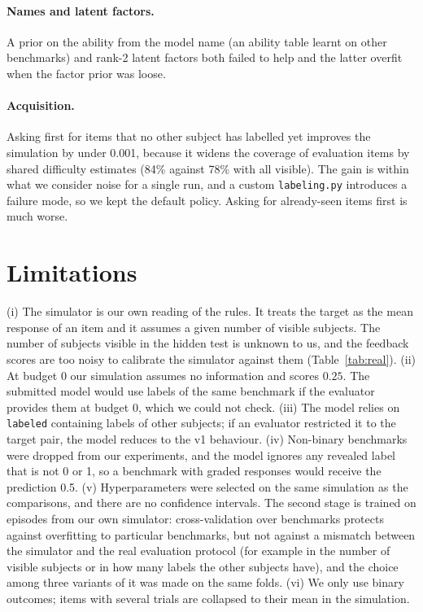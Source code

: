 \documentclass{article}
\begin{document}
\paragraph{Names and latent factors.} A prior on the ability from the model name (an ability table learnt on other benchmarks) and rank-2 latent factors both failed to help and the latter overfit when the factor prior was loose.

\paragraph{Acquisition.} Asking first for items that no other subject has labelled yet improves the simulation by under 0.001, because it widens the coverage of evaluation items by shared difficulty estimates (84\% against 78\% with all visible). The gain is within what we consider noise for a single run, and a custom \texttt{labeling.py} introduces a failure mode, so we kept the default policy. Asking for already-seen items first is much worse.

\section{Limitations}
\label{sec:limits}
(i) The simulator is our own reading of the rules. It treats the target as the mean response of an item and it assumes a given number of visible subjects. The number of subjects visible in the hidden test is unknown to us, and the feedback scores are too noisy to calibrate the simulator against them (Table~\ref{tab:real}). (ii) At budget 0 our simulation assumes no information and scores $0.25$. The submitted model would use labels of the same benchmark if the evaluator provides them at budget 0, which we could not check. (iii) The model relies on \texttt{labeled} containing labels of other subjects; if an evaluator restricted it to the target pair, the model reduces to the v1 behaviour. (iv) Non-binary benchmarks were dropped from our experiments, and the model ignores any revealed label that is not 0 or 1, so a benchmark with graded responses would receive the prediction 0.5. (v) Hyperparameters were selected on the same simulation as the comparisons, and there are no confidence intervals. The second stage is trained on episodes from our own simulator: cross-validation over benchmarks protects against overfitting to particular benchmarks, but not against a mismatch between the simulator and the real evaluation protocol (for example in the number of visible subjects or in how many labels the other subjects have), and the choice among three variants of it was made on the same folds. (vi) We only use binary outcomes; items with several trials are collapsed to their mean in the simulation.
\end{document}

